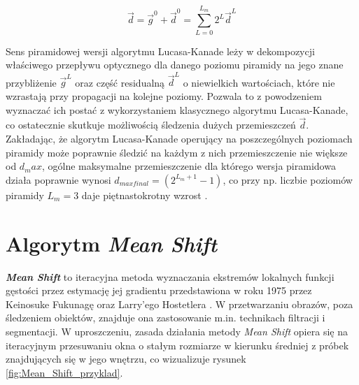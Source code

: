 \begin{equation}
\label{equ:Piramidowy_algorytm_Lucasa_Kanade_wynik_koncowy}
	\vec{d} = \vec{g}^0 + \vec{d}^0 = \sum_{L = 0}^{L_m} 2^L \vec{d}^L
\end{equation}

Sens piramidowej wersji algorytmu Lucasa-Kanade leży w dekompozycji właściwego przepływu optycznego dla danego poziomu piramidy na jego znane przybliżenie $\vec{g}^L$ oraz część residualną $\vec{d}^L$ o niewielkich wartościach, które nie wzrastają przy propagacji na kolejne poziomy. Pozwala to z powodzeniem wyznaczać ich postać z wykorzystaniem klasycznego algorytmu Lucasa-Kanade, co ostatecznie skutkuje możliwością śledzenia dużych przemieszczeń $\vec{d}$. Zakładając, że algorytm Lucasa-Kanade operujący na poszczególnych poziomach piramidy może poprawnie śledzić na każdym z nich  przemieszczenie nie większe od $d_max$, ogólne maksymalne przemieszczenie dla którego wersja piramidowa działa poprawnie wynosi $d_{max final} = (2^{L_m+1}-1)$, co przy np. liczbie poziomów piramidy $L_m = 3$ daje piętnastokrotny wzrost \cite{Bouguet2000}.


\section{Algorytm \textit{Mean Shift}}
\label{sec:Algorytm_Mean_Shift}

\textit{\textbf{Mean Shift}} to iteracyjna metoda wyznaczania ekstremów lokalnych funkcji gęstości przez estymację jej gradientu przedstawiona w roku 1975 przez Keinosuke Fukunagę oraz Larry'ego Hostetlera \cite{Comaniciu1999}. W przetwarzaniu obrazów, poza śledzeniem obiektów, znajduje ona zastosowanie m.in. technikach filtracji i segmentacji. W uproszczeniu, zasada działania metody \textit{Mean Shift} opiera się na iteracyjnym przesuwaniu okna o stałym rozmiarze w kierunku średniej z próbek znajdujących się w jego wnętrzu, co wizualizuje rysunek \ref{fig:Mean_Shift_przyklad}.

